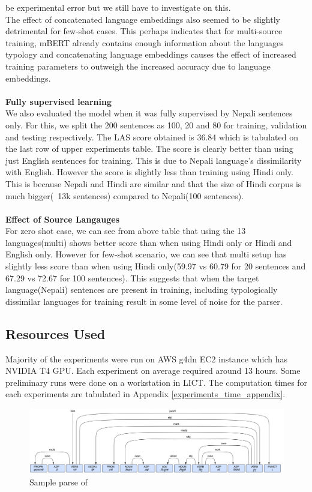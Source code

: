be experimental error but we still have to investigate on this.
\\
The effect of concatenated language embeddings also seemed to be slightly
detrimental for few-shot cases. This perhaps indicates that for multi-source
training, mBERT already contains enough information about the languages
typology and concatenating language embeddings causes the effect of increased
training parameters to outweigh the increased accuracy due to language embeddings.
\\~\\
\textbf{Fully supervised learning}\\
We also evaluated the model when it was fully supervised by Nepali sentences
only.  For this, we split the 200 sentences as 100, 20 and 80 for training,
validation and testing respectively. The LAS score obtained is 36.84 which is
tabulated on the last row of upper experiments table. The score is clearly
better than using just English sentences for training. This is due to Nepali
language's dissimilarity with English. However the score is  slightly less than
training using Hindi only. This is because Nepali and Hindi are similar and
that the size of Hindi corpus is much bigger(~13k sentences) compared to
Nepali(100 sentences).
\\~\\
\textbf{Effect of Source Langauges}\\
For zero shot case, we can see from above table that using the 13
languages(multi) shows better score than when using Hindi only or Hindi and
English only. However for few-shot scenario, we can see that multi setup has
slightly less score than when using Hindi only(59.97 vs 60.79 for 20 sentences
and 67.29 vs 72.67 for 100 sentences). This suggests that when the target
language(Nepali) sentences are present in training, including typologically
dissimilar languages for training result in some level of noise for the parser.

\subsection*{Resources Used}
Majority of the experiments were run on AWS g4dn EC2 instance which has NVIDIA
T4 GPU.  Each experiment on average required around 13 hours. Some preliminary
runs were done on a workstation in LICT. The computation times for each
experiments are tabulated in Appendix \ref{experiments_time_appendix}.

\begin{figure}[!h]
    \center
    \includegraphics[scale=0.15]{images/sample_result}
    \caption{Sample parse of }
    \label{img:sample_result1}
\end{figure}
